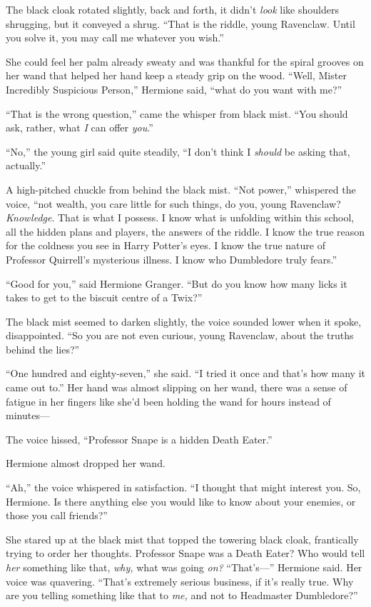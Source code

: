 The black cloak rotated slightly, back and forth, it didn’t \emph{look} like
shoulders shrugging, but it conveyed a shrug. “That is the riddle, young
Ravenclaw. Until you solve it, you may call me whatever you wish.”

She could feel her palm already sweaty and was thankful for the spiral grooves
on her wand that helped her hand keep a steady grip on the wood. “Well, Mister
Incredibly Suspicious Person,” Hermione said, “what do you want with me?”

“That is the wrong question,” came the whisper from black mist. “You should
ask, rather, what \emph{I} can offer \emph{you}.”

“No,” the young girl said quite steadily, “I don’t think I \emph{should} be
asking that, actually.”

A high-pitched chuckle from behind the black mist. “Not power,” whispered the
voice, “not wealth, you care little for such things, do you, young Ravenclaw?
\emph{Knowledge}. That is what I possess. I know what is unfolding within this
school, all the hidden plans and players, the answers of the riddle. I know the
true reason for the coldness you see in Harry Potter’s eyes. I know the true
nature of Professor Quirrell’s mysterious illness. I know who Dumbledore truly
fears.”

“Good for you,” said Hermione Granger. “But do you know how many licks it takes
to get to the biscuit centre of a Twix?”

The black mist seemed to darken slightly, the voice sounded lower when it
spoke, disappointed. “So you are not even curious, young Ravenclaw, about the
truths behind the lies?”

“One hundred and eighty-seven,” she said. “I tried it once and that’s how many
it came out to.” Her hand was almost slipping on her wand, there was a sense of
fatigue in her fingers like she’d been holding the wand for hours instead of
minutes—

The voice hissed, “Professor Snape is a hidden Death Eater.”

Hermione almost dropped her wand.

“Ah,” the voice whispered in satisfaction. “I thought that might interest you.
So, Hermione. Is there anything else you would like to know about your enemies,
or those you call friends?”

She stared up at the black mist that topped the towering black cloak,
frantically trying to order her thoughts. Professor Snape was a Death Eater?
Who would tell \emph{her} something like that, \emph{why,} what was going
\emph{on?} “That’s—” Hermione said. Her voice was quavering. “That’s
extremely serious business, if it’s really true. Why are you telling something
like that to \emph{me,} and not to Headmaster Dumbledore?”

